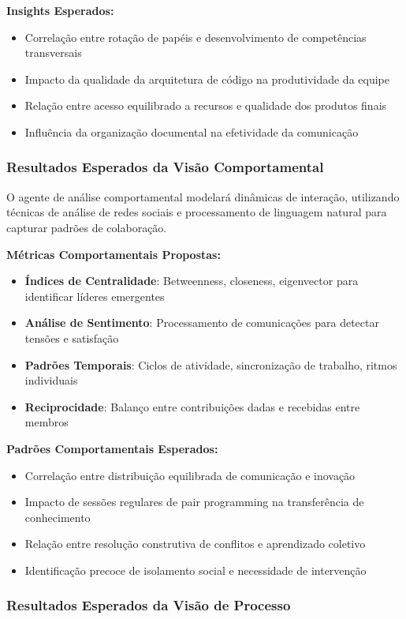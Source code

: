 \documentclass[english, spanish, brazilian]{modelo_dt}
\begin{document}
\textbf{Insights Esperados:}
\begin{itemize}
\item Correlação entre rotação de papéis e desenvolvimento de competências transversais
\item Impacto da qualidade da arquitetura de código na produtividade da equipe
\item Relação entre acesso equilibrado a recursos e qualidade dos produtos finais
\item Influência da organização documental na efetividade da comunicação
\end{itemize}

\subsubsection{Resultados Esperados da Visão Comportamental}

O agente de análise comportamental modelará dinâmicas de interação, utilizando técnicas de análise de redes sociais e processamento de linguagem natural para capturar padrões de colaboração.

\textbf{Métricas Comportamentais Propostas:}
\begin{itemize}
\item \textbf{Índices de Centralidade}: Betweenness, closeness, eigenvector para identificar líderes emergentes
\item \textbf{Análise de Sentimento}: Processamento de comunicações para detectar tensões e satisfação
\item \textbf{Padrões Temporais}: Ciclos de atividade, sincronização de trabalho, ritmos individuais
\item \textbf{Reciprocidade}: Balanço entre contribuições dadas e recebidas entre membros
\end{itemize}

\textbf{Padrões Comportamentais Esperados:}
\begin{itemize}
\item Correlação entre distribuição equilibrada de comunicação e inovação
\item Impacto de sessões regulares de pair programming na transferência de conhecimento
\item Relação entre resolução construtiva de conflitos e aprendizado coletivo
\item Identificação precoce de isolamento social e necessidade de intervenção
\end{itemize}

\subsubsection{Resultados Esperados da Visão de Processo}
\end{document}
